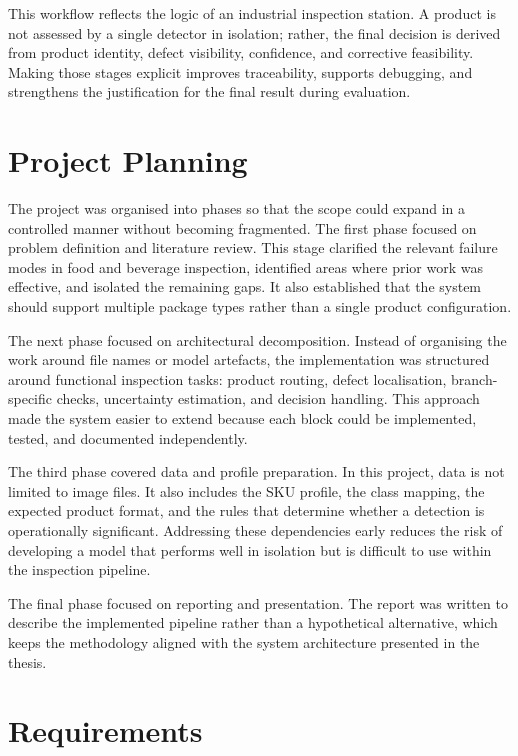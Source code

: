 \documentclass[12pt,a4paper]{report}
\begin{document}
This workflow reflects the logic of an industrial inspection station. A product is not assessed by a single detector in isolation; rather, the final decision is derived from product identity, defect visibility, confidence, and corrective feasibility. Making those stages explicit improves traceability, supports debugging, and strengthens the justification for the final result during evaluation.

\section{Project Planning}
\label{sec:project-planning}

The project was organised into phases so that the scope could expand in a controlled manner without becoming fragmented. The first phase focused on problem definition and literature review. This stage clarified the relevant failure modes in food and beverage inspection, identified areas where prior work was effective, and isolated the remaining gaps. It also established that the system should support multiple package types rather than a single product configuration.

The next phase focused on architectural decomposition. Instead of organising the work around file names or model artefacts, the implementation was structured around functional inspection tasks: product routing, defect localisation, branch-specific checks, uncertainty estimation, and decision handling. This approach made the system easier to extend because each block could be implemented, tested, and documented independently.

The third phase covered data and profile preparation. In this project, data is not limited to image files. It also includes the SKU profile, the class mapping, the expected product format, and the rules that determine whether a detection is operationally significant. Addressing these dependencies early reduces the risk of developing a model that performs well in isolation but is difficult to use within the inspection pipeline.

The final phase focused on reporting and presentation. The report was written to describe the implemented pipeline rather than a hypothetical alternative, which keeps the methodology aligned with the system architecture presented in the thesis.

\section{Requirements}
\label{sec:requirements}
\end{document}
